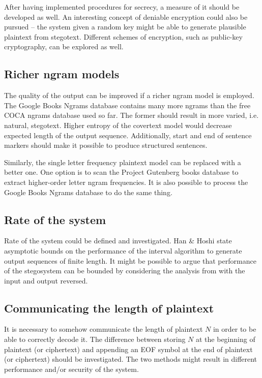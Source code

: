 \documentclass[12pt,twoside,a4paper]{article}
\makeatletter
\newcommand*{\ie}{i.e.\@\xspace}
\makeatother
\begin{document}
After having implemented procedures for secrecy, a measure of it should be developed as well. An interesting concept of deniable encryption could also be pursued -- the system given a random key might be able to generate plausible plaintext from stegotext. Different schemes of encryption, such as public-key cryptography, can be explored as well.

\subsection{Richer ngram models}

The quality of the output can be improved if a richer ngram model is employed. The Google Books Ngrams database contains many more ngrams than the free COCA ngrams database used so far. The former should result in more varied, \ie natural, stegotext. Higher entropy of the covertext model would decrease expected length of the output sequence. Additionally, start and end of sentence markers should make it possible to produce structured sentences.

Similarly, the single letter frequency plaintext model can be replaced with a better one. One option is to scan the Project Gutenberg books database to extract higher-order letter ngram frequencies. It is also possible to process the Google Books Ngrams database to do the same thing.

\subsection{Rate of the system}

Rate of the system could be defined and investigated. Han \& Hoshi \cite{hanhoshi1997} state asymptotic bounds on the performance of the interval algorithm to generate output sequences of finite length. It might be possible to argue that performance of the stegosystem can be bounded by considering the analysis from \cite{hanhoshi1997} with the input and output reversed.

\subsection{Communicating the length of plaintext}

It is necessary to somehow communicate the length of plaintext $N$ in order to be able to correctly decode it. The difference between storing $N$ at the beginning of plaintext (or ciphertext) and appending an EOF symbol at the end of plaintext (or ciphertext) should be investigated. The two methods might result in different performance and/or security of the system.
\end{document}
